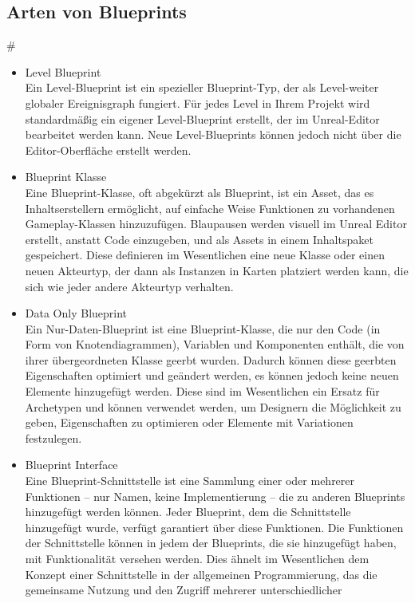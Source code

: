 \subsection{Arten von Blueprints}#
\begin{itemize}
    \item Level Blueprint\\
    Ein Level-Blueprint ist ein spezieller Blueprint-Typ, der als Level-weiter globaler Ereignisgraph
    fungiert. Für jedes Level in Ihrem Projekt wird standardmäßig ein eigener Level-Blueprint erstellt,
    der im Unreal-Editor bearbeitet werden kann. Neue Level-Blueprints können jedoch nicht über die
    Editor-Oberfläche erstellt werden.
    \item Blueprint Klasse\\
    Eine Blueprint-Klasse, oft abgekürzt als Blueprint, ist ein Asset, das es Inhaltserstellern ermöglicht,
    auf einfache Weise Funktionen zu vorhandenen Gameplay-Klassen hinzuzufügen. Blaupausen werden visuell
    im Unreal Editor erstellt, anstatt Code einzugeben, und als Assets in einem Inhaltspaket gespeichert.
    Diese definieren im Wesentlichen eine neue Klasse oder einen neuen Akteurtyp, der dann als Instanzen in
    Karten platziert werden kann, die sich wie jeder andere Akteurtyp verhalten.
    \item Data Only Blueprint\\
    Ein Nur-Daten-Blueprint ist eine Blueprint-Klasse, die nur den Code (in Form von Knotendiagrammen),
    Variablen und Komponenten enthält, die von ihrer übergeordneten Klasse geerbt wurden. Dadurch können
    diese geerbten Eigenschaften optimiert und geändert werden, es können jedoch keine neuen Elemente hinzugefügt
    werden. Diese sind im Wesentlichen ein Ersatz für Archetypen und können verwendet werden, um Designern die
    Möglichkeit zu geben, Eigenschaften zu optimieren oder Elemente mit Variationen festzulegen.
    \item Blueprint Interface\\
    Eine Blueprint-Schnittstelle ist eine Sammlung einer oder mehrerer Funktionen – nur Namen, keine Implementierung –
    die zu anderen Blueprints hinzugefügt werden können. Jeder Blueprint, dem die Schnittstelle hinzugefügt wurde,
    verfügt garantiert über diese Funktionen. Die Funktionen der Schnittstelle können in jedem der Blueprints,
    die sie hinzugefügt haben, mit Funktionalität versehen werden. Dies ähnelt im Wesentlichen dem Konzept einer
    Schnittstelle in der allgemeinen Programmierung, das die gemeinsame Nutzung und den Zugriff mehrerer unterschiedlicher

\end{itemize}
